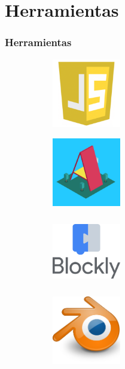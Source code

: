 \documentclass[xcolor={table}]{beamer}
\begin{document}
	\section{Herramientas}
		\begin{frame}
			\frametitle{Herramientas}
                \begin{figure}[H]
                \centering
                \begin{subfigure}{\textwidth}
                    \includegraphics[width=3cm, height=3cm]{img/js.png}
                \label{fig:figure2_4}
                \end{subfigure}
                \begin{subfigure}{\textwidth}
                    \includegraphics[width=3cm, height=3cm]{img/aframe.png}
                \label{fig:figure2_5}
                \end{subfigure}\hfill
                \begin{subfigure}{\textwidth}
                    \includegraphics[width=3cm, height=3cm]{img/blockly.png}
                \label{fig:figure2_6}
                \end{subfigure}\hfill
                \begin{subfigure}{\textwidth}                    \includegraphics[width=3cm, height=3cm]{img/blender.png}

\end{subfigure}
\end{figure}
\end{frame}
\end{document}
